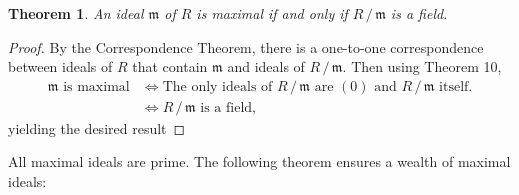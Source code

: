 \documentclass[11pt]{article}
\newtheorem{theorem}{Theorem}
\begin{document}
\begin{adjustwidth}{0.5cm}{}
	\begin{theorem}
		An ideal $\mathfrak{m}$ of $R$ is maximal if and only if $R \,/\, \mathfrak{m}$ is a field.
	\end{theorem}
	\begin{proof}
		By the Correspondence Theorem, there is a one-to-one correspondence between ideals of $R$ that contain $\mathfrak{m}$ and ideals of $R \,/\, \mathfrak{m}$. Then using Theorem 10,
		\begin{align*}
			\mathfrak{m} \text{ is maximal} &\iff \text{The only ideals of $R \,/\, \mathfrak{m}$ are $(0)$ and $R \,/\, \mathfrak{m}$ itself.} \\
			&\iff R \,/\, \mathfrak{m} \text{ is a field},
		\end{align*}
		yielding the desired result
	\end{proof}
\end{adjustwidth}

All maximal ideals are prime. The following theorem ensures a wealth of maximal ideals:
\end{document}
